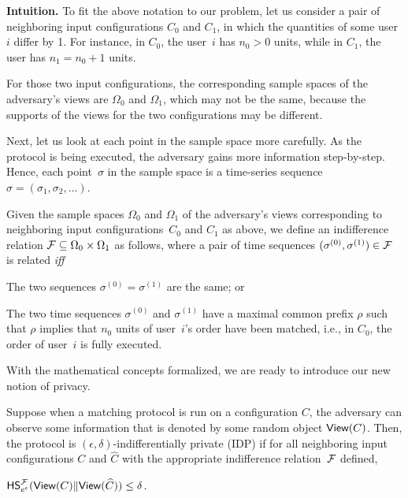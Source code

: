 \noindent \textbf{Intuition.} To fit the above notation to
our problem, let us consider a pair of neighboring input configurations
$C_0$ and $C_1$, in which the quantities of some user~$i$ differ by 1.
For instance, in $C_0$, the user~$i$ has $n_0 > 0$ units, while in $C_1$,
the user has $n_1 = n_0 + 1$ units.

For those two input configurations,
the corresponding sample spaces of the adversary's views
are $\Omega_0$ and $\Omega_1$, which may not be the same,
because the supports of the views for the two configurations may be different.

Next, let us look at each point in the sample space more carefully.
As the protocol is being executed, the adversary gains more information step-by-step.
Hence, each point~$\sigma$ in the sample space is
a time-series sequence $\sigma = (\sigma_1, \sigma_2, \ldots)$.

\begin{definition}
\label{defn:indifference}
Given the sample spaces $\Omega_0$ and $\Omega_1$ of
the adversary's views corresponding
to neighboring input configurations~$C_0$ and $C_1$ as above,
we define an indifference relation $\mathcal {F} \subseteq \Omega_0 \times \Omega_1$
as follows, where a pair of time sequences $(\sigma^{(0)}, \sigma^{(1)}) \in \mathcal {F}$ is related \emph{iff}

\begin{compactitem}

\item  The two sequences $\sigma^{(0)} = \sigma^{(1)}$ are the same; or

\item The two time sequences $\sigma^{(0)}$ and $\sigma^{(1)}$
have a maximal common prefix $\rho$ such that $\rho$ implies that
$n_0$ units of user~$i$'s order have been matched, i.e.,
in $C_0$, the order of user~$i$ is fully executed.
\end{compactitem}

\end{definition}

With the mathematical concepts formalized,
we are ready to introduce our new notion of privacy.


\begin{definition}
\label{defn:idp}
Suppose when a matching protocol is run on a configuration $C$,
the adversary can observe some information that is denoted by 
some random object ${\mathsf {View}}(C)$.
Then, the protocol is $(\epsilon, \delta)$-indifferentially private (IDP)
if for all neighboring input configurations $C$ and $\widehat{C}$
with the appropriate indifference relation~$\mathcal {F}$ defined,

${\sf HS}^{\mathcal {F}}_{e^\epsilon}({\mathsf {View}}(C) \| {\mathsf {View}}(\widehat{C})) \leq \delta$.
\end{definition}





